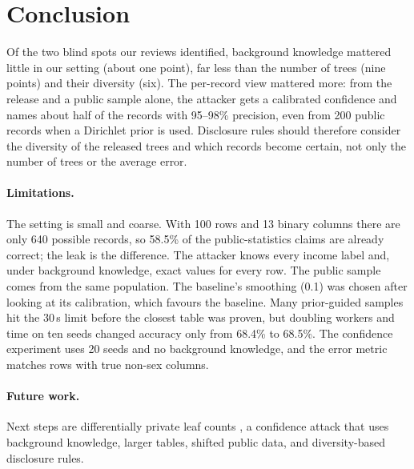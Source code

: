 \section{Conclusion}

Of the two blind spots our reviews identified, background knowledge mattered little in our setting (about one point), far less than the number of trees (nine points) and their diversity (six). The per-record view mattered more: from the release and a public sample alone, the attacker gets a calibrated confidence and names about half of the records with 95--98\% precision, even from 200 public records when a Dirichlet prior is used. Disclosure rules should therefore consider the diversity of the released trees and which records become certain, not only the number of trees or the average error.

\paragraph{Limitations.} The setting is small and coarse. With 100 rows and 13 binary columns there are only 640 possible records, so 58.5\% of the public-statistics claims are already correct; the leak is the difference. The attacker knows every income label and, under background knowledge, exact values for every row. The public sample comes from the same population. The baseline's smoothing (0.1) was chosen after looking at its calibration, which favours the baseline. Many prior-guided samples hit the 30\,s limit before the closest table was proven, but doubling workers and time on ten seeds changed accuracy only from 68.4\% to 68.5\%. The confidence experiment uses 20 seeds and no background knowledge, and the error metric matches rows with true non-sex columns.

\paragraph{Future work.} Next steps are differentially private leaf counts \citep{gorge2026dp}, a confidence attack that uses background knowledge, larger tables, shifted public data, and diversity-based disclosure rules.
